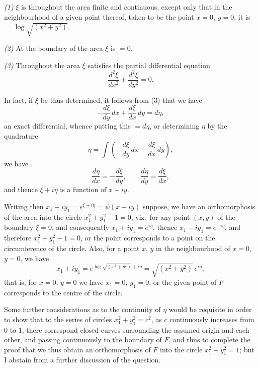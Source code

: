 \documentclass[11pt,a4paper]{article}
\begin{document}
\textit{(1)} $\xi$ is throughout the area finite and continuous, except only that in the neighbourhood of a given point thereof, taken to be the point $x = 0$, $y = 0$, it is $= \log\sqrt{(x^2 + y^2)}$.

\textit{(2)} At the boundary of the area $\xi$ is $= 0$.

\textit{(3)} Throughout the area $\xi$ satisfies the partial differential equation
\[
\frac{d^2\xi}{dx^2} + \frac{d^2\xi}{dy^2} = 0.
\]

In fact, if $\xi$ be thus determined, it follows from (3) that we have
\[
-\frac{d\xi}{dy}\,dx + \frac{d\xi}{dx}\,dy = d\eta,
\]
an exact differential, whence putting this $= d\eta$, or determining $\eta$ by the quadrature
\[
\eta = \int\!\left(-\frac{d\xi}{dy}\,dx + \frac{d\xi}{dx}\,dy\right),
\]
we have
\[
\frac{d\eta}{dx} = -\frac{d\xi}{dy}, \qquad \frac{d\eta}{dy} = \frac{d\xi}{dx},
\]
and thence $\xi + i\eta$ is a function of $x + iy$.

Writing then $x_1 + i y_1 = e^{\xi + i\eta} = \psi(x + iy)$ suppose, we have an orthomorphosis of the area into the circle $x_1^2 + y_1^2 - 1 = 0$, viz.\ for any point $(x, y)$ of the boundary $\xi = 0$, and consequently $x_1 + i y_1 = e^{i\eta}$, thence $x_1 - i y_1 = e^{-i\eta}$, and therefore $x_1^2 + y_1^2 - 1 = 0$, or the point corresponds to a point on the circumference of the circle. Also, for a point $x$, $y$ in the neighbourhood of $x = 0$, $y = 0$, we have
\[
x_1 + i y_1 = e^{\log\sqrt{(x^2+y^2)} + i\eta} = \sqrt{(x^2+y^2)}\, e^{i\eta},
\]
that is, for $x = 0$, $y = 0$ we have $x_1 = 0$, $y_1 = 0$, or the given point of $F$ corresponds to the centre of the circle.

Some further considerations as to the continuity of $\eta$ would be requisite in order to show that to the series of circles $x_1^2 + y_1^2 = c^2$, as $c$ continuously increases from 0 to 1, there correspond closed curves surrounding the assumed origin and each other, and passing continuously to the boundary of $F$, and thus to complete the proof that we thus obtain an orthomorphosis of $F$ into the circle $x_1^2 + y_1^2 = 1$; but I abstain from a further discussion of the question.
\end{document}
